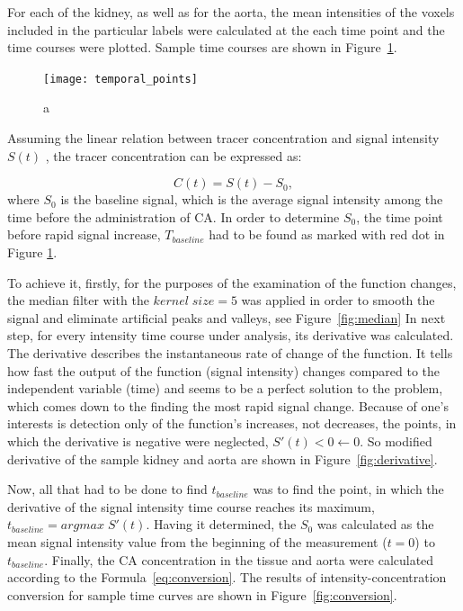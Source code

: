 For each of the kidney, as well as for the aorta, the mean intensities of the voxels included in the particular labels were calculated at the each time point and the time courses were plotted. Sample time courses are shown in Figure~\ref{fig:temporal_points}.

\vspace{10pt}
\begin{figure}[H]
	\centering
	\texttt{[image: temporal\_points]}
	
\caption[a]{a}
\label{fig:temporal_points}
\end{figure}




Assuming the linear relation between tracer concentration and signal intensity $S(t)$ \cite{lim2013prediction}, the tracer concentration can be expressed as:


\begin{equation}
	\label{eq:conversion}
	C(t) = S(t)-S_0,
\end{equation}
where $S_0$ is the baseline signal, which is the average signal intensity among the time before the administration of CA. 
In order to determine $S_0$, the time point before rapid signal increase, $T_{baseline}$ had to be found  as marked with red dot in Figure \ref{fig:temporal_points}.

To achieve it, firstly, for the purposes of the examination of the function changes, the median filter  with the $kernel\;size = 5$ was applied in order to smooth the signal and eliminate artificial  peaks and valleys, see Figure~\ref{fig:median}  
In next step, for every intensity time course under analysis, its derivative was calculated. The derivative describes the instantaneous rate of change of the function. It tells how fast the output of the function (signal intensity) changes compared to the independent variable (time) \cite{calculus} and seems to be a perfect solution to the problem, which comes down to the finding the most rapid signal change. 
Because of one's interests is detection only of the function's increases, not decreases, the points, in which the derivative is negative were neglected, $S'(t)<0\leftarrow0$. So modified derivative of the sample kidney and aorta are shown in Figure~\ref{fig:derivative}.

Now, all that had to be done to find $t_{baseline}$ was to find the point, in which the derivative of the signal intensity time course reaches its maximum, $t_{baseline}=argmax\;S'(t)$. Having it determined, the $S_0$ was calculated as the mean signal intensity value from the beginning of the measurement ($t=0$) to $t_{baseline}$. Finally, the CA concentration in the tissue and aorta were calculated according to the Formula~\ref{eq:conversion}. The results of intensity-concentration conversion for sample time curves are shown in Figure~\ref{fig:conversion}. 

